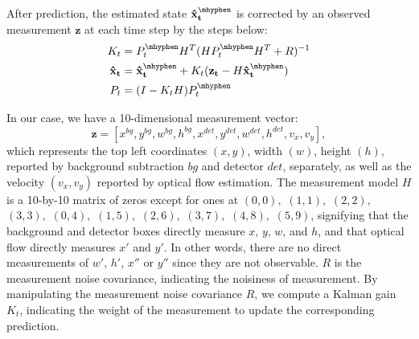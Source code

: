 

After prediction, the estimated state $\mathbf{\hat{x}^{\mhyphen}_t}$ is corrected by an observed measurement $\mathbf{z}$ at each time step by the steps below: 
\begin{align}
K_t & = P^{\mhyphen}_t H^T(HP^{\mhyphen}_t H^T+R)^{-1} \label{eq:predict_gain}\\
\mathbf{\hat{x}_t} & = \mathbf{\hat{x}^{\mhyphen}_t} + K_t(\mathbf{z_t} - H\mathbf{\hat{x}^{\mhyphen}_t)} \label{eq:correct} \\
P_t & = (I-K_tH)P^{\mhyphen}_t \label{eq:predict_noise_cov_post}
\end{align}

In our case, we have a 10-dimensional measurement vector: 
$$\mathbf{z}=[x^{bg}, y^{bg}, w^{bg}, h^{bg}, x^{det}, y^{det}, w^{det}, h^{det}, v_x, v_y],$$ 
which represents the top left coordinates $(x, y)$, width $(w)$, height $(h)$, reported by background subtraction $bg$ and detector $det$, separately, as well as the velocity $(v_x, v_y)$ reported by optical flow estimation. 
The measurement model $H$ is a 10-by-10 matrix of zeros except for ones at $(0, 0),$ $(1, 1),$ $(2, 2),$ $(3, 3),$ $(0, 4),$ $(1, 5),$ $(2, 6),$ $(3, 7),$ $(4, 8),$ $(5,9)$, signifying that the background and detector boxes directly measure $x$, $y$, $w$, and $h$, and that optical flow directly measures $x'$ and $y'$. In other words, there are no direct measurements of $w'$, $h'$, $x''$ or $y''$ since they are not observable.
$R$ is the measurement noise covariance, indicating the noisiness of measurement. By manipulating the measurement noise covariance $R$, we compute a Kalman gain $K_t$, indicating the weight of the measurement to update the corresponding prediction. 


